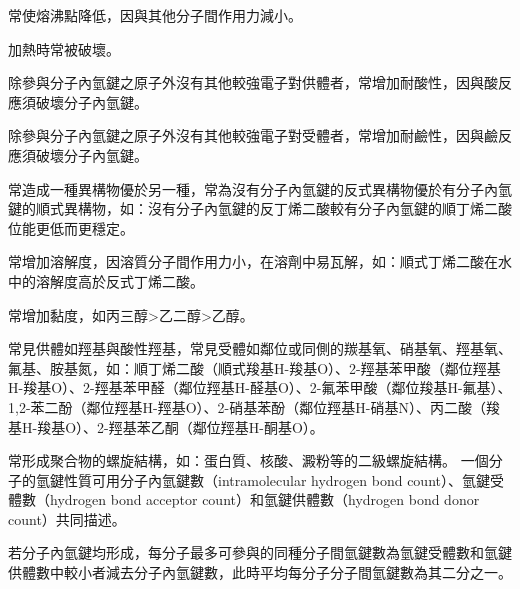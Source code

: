\documentclass[a4paper,12pt]{report}
\begin{document}
\item 常使熔沸點降低，因與其他分子間作用力減小。
\item 加熱時常被破壞。
\item 除參與分子內氫鍵之原子外沒有其他較強電子對供體者，常增加耐酸性，因與酸反應須破壞分子內氫鍵。
\item 除參與分子內氫鍵之原子外沒有其他較強電子對受體者，常增加耐鹼性，因與鹼反應須破壞分子內氫鍵。
\item 常造成一種異構物優於另一種，常為沒有分子內氫鍵的反式異構物優於有分子內氫鍵的順式異構物，如：沒有分子內氫鍵的反丁烯二酸較有分子內氫鍵的順丁烯二酸位能更低而更穩定。
\item 常增加溶解度，因溶質分子間作用力小，在溶劑中易瓦解，如：順式丁烯二酸在水中的溶解度高於反式丁烯二酸。
\item 常增加黏度，如丙三醇>乙二醇>乙醇。
\item 常見供體如羥基與酸性羥基，常見受體如鄰位或同側的羰基氧、硝基氧、羥基氧、氟基、胺基氮，如：順丁烯二酸（順式羧基H-羧基O）、2-羥基苯甲酸（鄰位羥基H-羧基O）、2-羥基苯甲醛（鄰位羥基H-醛基O）、2-氟苯甲酸（鄰位羧基H-氟基）、1,2-苯二酚（鄰位羥基H-羥基O）、2-硝基苯酚（鄰位羥基H-硝基N）、丙二酸（羧基H-羧基O）、2-羥基苯乙酮（鄰位羥基H-酮基O）。
\item 常形成聚合物的螺旋結構，如：蛋白質、核酸、澱粉等的二級螺旋結構。
\eit
{}
一個分子的氫鍵性質可用分子內氫鍵數（intramolecular hydrogen bond count）、氫鍵受體數（hydrogen bond acceptor count）和氫鍵供體數（hydrogen bond donor count）共同描述。

若分子內氫鍵均形成，每分子最多可參與的同種分子間氫鍵數為氫鍵受體數和氫鍵供體數中較小者減去分子內氫鍵數，此時平均每分子分子間氫鍵數為其二分之一。
\end{document}
